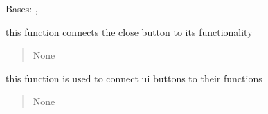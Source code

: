 \documentclass[letterpaper,10pt,english]{sphinxmanual}
\begin{document}
\begin{savenotes}\begin{fulllineitems}
\label{\detokenize{setting/notif_UI:oxin.notif_UI.UI_main_window}}
\pysigstartsignatures
{}
\pysigstopsignatures
\sphinxAtStartPar
Bases: , 

\begin{savenotes}\begin{fulllineitems}
\label{\detokenize{setting/notif_UI:oxin.notif_UI.UI_main_window.activate_}}
\pysigstartsignatures
{}
\pysigstopsignatures
\sphinxAtStartPar
this function connects the close button to its functionality
\begin{quote}\begin{description}
\sphinxAtStartPar
None

\end{description}\end{quote}

\end{fulllineitems}\end{savenotes}


\begin{savenotes}\begin{fulllineitems}
\label{\detokenize{setting/notif_UI:oxin.notif_UI.UI_main_window.buttonClick}}
\pysigstartsignatures
{}
\pysigstopsignatures
\sphinxAtStartPar
this function is used to connect ui buttons to their functions
\begin{quote}\begin{description}
\sphinxAtStartPar
None

\end{description}\end{quote}


\end{fulllineitems}
\end{savenotes}
\end{fulllineitems}
\end{savenotes}
\end{document}

